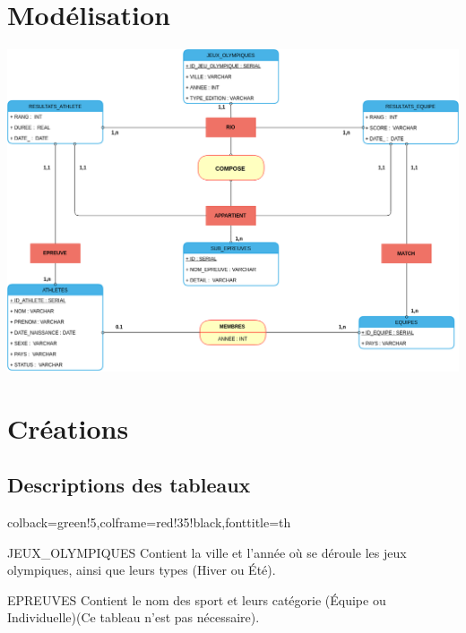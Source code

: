 \documentclass[]{scrreprt}
\begin{document}
	\chapter{Modélisation}
	\label{Chapter2}
	
		\begin{center}
			\includegraphics[scale=0.56 , angle=270]{DiagramAlpha.png}
		\end{center}	
	
	\chapter{Créations}
	\label{Chapter3}
	
		\section{Descriptions des tableaux}
		
		
		{colback=green!5,colframe=red!35!black,fonttitle=\slshape}{th}
		
			\vspace{1cm}
	
			\begin{mytheo}{JEUX\_OLYMPIQUES}{}
				Contient la ville et l'année où se déroule les jeux olympiques, ainsi que leurs types (Hiver ou Été).
			\end{mytheo}
			
			\vspace{0.5cm}
			
			\begin{mytheo}{EPREUVES}{}
				Contient le nom des sport et leurs catégorie (Équipe ou Individuelle)(Ce tableau n'est pas nécessaire).
			\end{mytheo}
		
\end{document}
